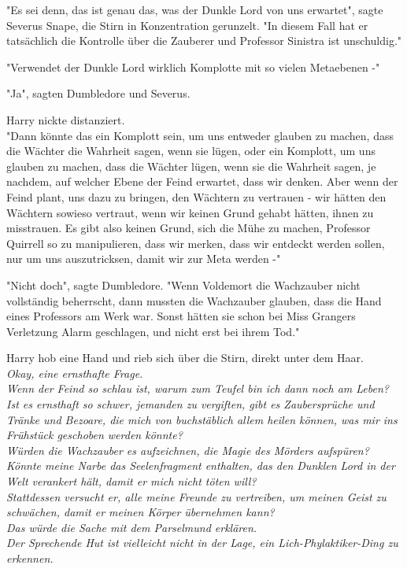 {"Es sei denn, das ist genau das, was der Dunkle Lord von uns erwartet", sagte Severus Snape, die Stirn in Konzentration gerunzelt. "In diesem Fall hat er tatsächlich die Kontrolle über die Zauberer und Professor Sinistra ist unschuldig."

"Verwendet der Dunkle Lord wirklich Komplotte mit so vielen Metaebenen -"

"Ja", sagten Dumbledore und Severus.

Harry nickte distanziert.\\ "Dann könnte das ein Komplott sein, um uns entweder glauben zu machen, dass die Wächter die Wahrheit sagen, wenn sie lügen, oder ein Komplott, um uns glauben zu machen, dass die Wächter lügen, wenn sie die Wahrheit sagen, je nachdem, auf welcher Ebene der Feind erwartet, dass wir denken. Aber wenn der Feind plant, uns dazu zu bringen, den Wächtern zu vertrauen - wir hätten den Wächtern sowieso vertraut, wenn wir keinen Grund gehabt hätten, ihnen zu misstrauen. Es gibt also keinen Grund, sich die Mühe zu machen, Professor Quirrell so zu manipulieren, dass wir merken, dass wir entdeckt werden sollen, nur um uns auszutricksen, damit wir zur Meta werden -"

"Nicht doch", sagte Dumbledore. "Wenn Voldemort die Wachzauber nicht vollständig beherrscht, dann mussten die Wachzauber glauben, dass die Hand eines Professors am Werk war. Sonst hätten sie schon bei Miss Grangers Verletzung Alarm geschlagen, und nicht erst bei ihrem Tod."

Harry hob eine Hand und rieb sich über die Stirn, direkt unter dem Haar.\\ \emph{Okay, eine ernsthafte Frage.}\\ \emph{Wenn der Feind so schlau ist, warum zum Teufel bin ich dann noch am Leben?}\\ \emph{Ist es ernsthaft so schwer, jemanden zu vergiften, gibt es Zaubersprüche und Tränke und Bezoare, die mich von buchstäblich allem heilen können, was mir ins Frühstück geschoben werden könnte?}\\ \emph{Würden die Wachzauber es aufzeichnen, die Magie des Mörders aufspüren?}\\ \emph{Könnte meine Narbe das Seelenfragment enthalten, das den Dunklen Lord in der Welt verankert hält, damit er mich nicht töten will?}\\ \emph{Stattdessen versucht er, alle meine Freunde zu vertreiben, um meinen Geist zu schwächen, damit er meinen Körper übernehmen kann?}\\ \emph{Das würde die Sache mit dem Parselmund erklären.}\\ \emph{Der Sprechende Hut ist vielleicht nicht in der Lage, ein Lich-Phylaktiker-Ding zu erkennen.}

}

